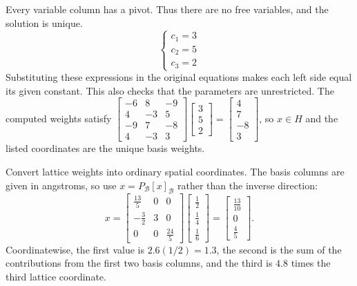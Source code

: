 Every variable column has a pivot. Thus there are no free variables, and the solution is unique.
\[ \begin{cases}c_{1}=3\\c_{2}=5\\c_{3}=2\end{cases}\]
Substituting these expressions in the original equations makes each left side equal its given constant. This also checks that the parameters are unrestricted.
The computed weights satisfy $\left[\begin{array}{rrr}-6&8&-9\\4&-3&5\\-9&7&-8\\4&-3&3\end{array}\right]\left[\begin{array}{r}3\\5\\2\end{array}\right]=\left[\begin{array}{r}4\\7\\-8\\3\end{array}\right]$, so $x\in H$ and the listed coordinates are the unique basis weights.

\goal Convert lattice weights into ordinary spatial coordinates.
The basis columns are given in angstroms, so use $x=P_{\mathcal B}[x]_{\mathcal B}$ rather than the inverse direction:
\[x=\left[\begin{array}{rrr}\frac{13}{5}&0&0\\- \frac{3}{2}&3&0\\0&0&\frac{24}{5}\end{array}\right]\left[\begin{array}{r}\frac{1}{2}\\\frac{1}{4}\\\frac{1}{6}\end{array}\right]=\left[\begin{array}{r}\frac{13}{10}\\0\\\frac{4}{5}\end{array}\right].\]
Coordinatewise, the first value is $2.6(1/2)=1.3$, the second is the sum of the contributions from the first two basis columns, and the third is $4.8$ times the third lattice coordinate.

